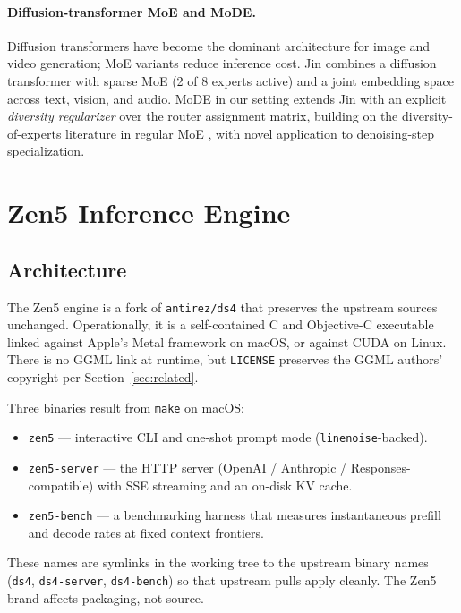 \documentclass[11pt,a4paper]{article}
\begin{document}
\paragraph{Diffusion-transformer MoE and MoDE.} Diffusion transformers \cite{dit} have become the
dominant architecture for image and video generation; MoE variants \cite{rapid,mome} reduce
inference cost. Jin \cite{jin} combines a diffusion transformer with sparse MoE (2 of 8 experts
active) and a joint embedding space across text, vision, and audio. MoDE in our setting extends Jin
with an explicit \emph{diversity regularizer} over the router assignment matrix, building on the
diversity-of-experts literature in regular MoE \cite{diverse-moe}, with novel application to
denoising-step specialization.

\section{Zen5 Inference Engine}
\label{sec:engine}

\subsection{Architecture}

The Zen5 engine is a fork of \texttt{antirez/ds4} that preserves the upstream sources unchanged.
Operationally, it is a self-contained C and Objective-C executable linked against Apple's Metal
framework on macOS, or against CUDA on Linux. There is no GGML link at runtime, but
\texttt{LICENSE} preserves the GGML authors' copyright per Section~\ref{sec:related}.

Three binaries result from \texttt{make} on macOS:

\begin{itemize}
  \item \texttt{zen5} --- interactive CLI and one-shot prompt mode (\texttt{linenoise}-backed).
  \item \texttt{zen5-server} --- the HTTP server (OpenAI / Anthropic / Responses-compatible) with
        SSE streaming and an on-disk KV cache.
  \item \texttt{zen5-bench} --- a benchmarking harness that measures instantaneous prefill and
        decode rates at fixed context frontiers.
\end{itemize}

These names are symlinks in the working tree to the upstream binary names (\texttt{ds4}, \texttt{ds4-server},
\texttt{ds4-bench}) so that upstream pulls apply cleanly. The Zen5 brand affects packaging, not source.
\end{document}
